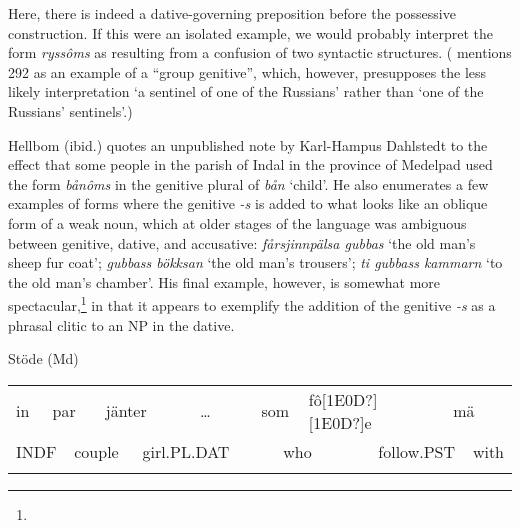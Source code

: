 \begin{styleBodyTextFirst}
Here, there is indeed a dative-governing preposition before the possessive construction. If this were an isolated example, we would probably interpret the form \textit{ryssôms} as resulting from a confusion of two syntactic structures. (\citet[38]{Delsing2003a} mentions 292 as an example of a “group genitive”, which, however, presupposes the less likely interpretation ‘a sentinel of one of the Russians’ rather than ‘one of the Russians’ sentinels’.) 

\end{styleBodyTextFirst}

\begin{styleBodytextC}
Hellbom (ibid.) quotes an unpublished note by Karl-Hampus Dahlstedt to the effect that some people in the parish of Indal in the province of Medelpad used the form \textit{bånôms} in the genitive plural of \textit{bån} ‘child’. He also enumerates a few examples of forms where the genitive\textit{ -s} is added to what looks like an oblique form of a weak noun, which at older stages of the language was ambiguous between genitive, dative, and accusative: \textit{fårsjinnpälsa gubbas} ‘the old man’s sheep fur coat’; \textit{gu{\textasciigrave}bbass bökksan} ‘the old man’s trousers’; \textit{ti gu{\textasciigrave}bbass kammarn} ‘to the old man’s chamber’. His final example, however, is somewhat more spectacular,\footnote{} in that it appears to exemplify the addition of the genitive\textit{ -s} as a phrasal clitic to an NP in the dative. 

\end{styleBodytextC}

\begin{listWWNumileveli}
\item 

\begin{styleExample}
Stöde (Md)

\end{styleExample}

\end{listWWNumileveli}

\begin{tabular}{llllllllllllll}
\lsptoprule
in & \multicolumn{2}{l}{par

} & \multicolumn{2}{l}{jänter

} & \multicolumn{2}{l}{…

} & \multicolumn{2}{l}{som

} & \multicolumn{2}{l}{fô[1E0D?][1E0D?]e

} & \multicolumn{2}{l}{mä

} & \\
\multicolumn{2}{l}{INDF

} & \multicolumn{2}{l}{couple

} & \multicolumn{2}{l}{girl.PL.DAT

} & \multicolumn{2}{l}{} & \multicolumn{2}{l}{who

} & \multicolumn{2}{l}{follow.PST

} & \multicolumn{2}{l}{with

}\\
\lspbottomrule
\end{tabular}

